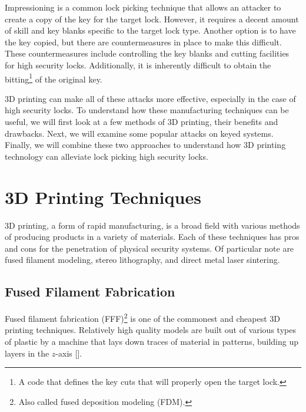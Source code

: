 \documentclass{acm_proc_article-sp}
\begin{document}
Impressioning is a common lock picking technique that allows an attacker to create a copy of the key for the target lock. However, it requires a decent amount of skill and key blanks specific to the target lock type. Another option is to have the key copied, but there are countermeasures in place to make this difficult. These countermeasures include controlling the key blanks and cutting facilities for high security locks. Additionally, it is inherently difficult to obtain the bitting\footnote{A code that defines the key cuts that will properly open the target lock.} of the original key.

3D printing can make all of these attacks more effective, especially in the case of high security locks. To understand how these manufacturing techniques can be useful, we will first look at a few methods of 3D printing, their benefits and drawbacks. Next, we will examine some popular attacks on keyed systems. Finally, we will combine these two approaches to understand how 3D printing technology can alleviate lock picking high security locks.

\section{3D Printing Techniques}
3D printing, a form of rapid manufacturing, is a broad field with various methods of producing products in a variety of materials. Each of these techniques has pros and cons for the penetration of physical security systems. Of particular note are fused filament modeling, stereo lithography, and direct metal laser sintering.

\subsection{Fused Filament Fabrication}
Fused filament fabrication (FFF)\footnote{Also called fused deposition modeling (FDM).} is one of the commonest and cheapest 3D printing techniques. Relatively high quality models are built out of various types of plastic by a machine that lays down traces of material in patterns, building up layers in the $z$-axis [\citealt{VALAVAARA}].
\end{document}
